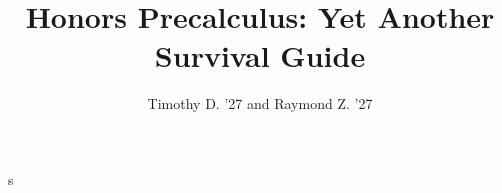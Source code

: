 \documentclass[12pt]{scrreprt}
\begin{document}
s
\title{Honors Precalculus: Yet Another Survival Guide}
\author{Timothy D. '27 and Raymond Z. '27}
\maketitle

\tableofcontents















\appendix{}


\end{document}
